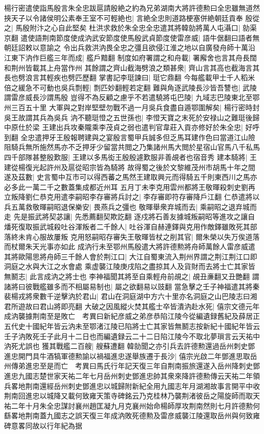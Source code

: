楊行密遣使詣馬殷言朱全忠跋扈請殷絶之約為兄弟湖南大將許德勲曰全忠雖無道然挾天子以令諸侯明公素奉王室不可輕絶也|{
	言絶全忠則道路梗塞併絶朝廷貢奉}
殷從之|{
	馬殷附汴之心自此堅矣}
杜洪求救於朱全忠全忠遣其將韓勍將萬人屯灄口|{
	勍渠京翻}
遣使語荆南節度使成汭武安節度使馬殷武貞節度使雷彦威|{
	語牛倨翻曰語者無朝廷詔敕以意諭之}
令出兵救洪汭畏全忠之彊且欲侵江淮之地以自廣發舟師十萬沿江東下汭作巨艦三年而成|{
	艦戶黯翻}
制度如府署謂之和舟載|{
	署廨舍也言其舟長闊和荆州皆載其上舟當作州}
其餘謂之齊山截海劈浪之類甚衆|{
	齊山言其高也截海言其長也劈浪言其輕疾也劈匹歷翻}
掌書記李珽諫曰|{
	珽它鼎翻}
今每艦載甲士千人稻米倍之緩急不可動也吳兵剽輕|{
	剽匹妙翻輕若定翻}
難與角逐武陵長沙皆吾讐也|{
	武陵謂雷彦威長沙謂馬殷}
豈得不為反顧之慮乎不若遣驍將屯巴陵|{
	九域志巴陵東北至鄂州三百五十里}
大軍與之對岸堅壁勿戰不過一月吳兵食盡自遁鄂圍解矣|{
	楊行密時封吳王故謂其兵為吳兵}
汭不聽珽憕之五世孫也|{
	李憕天寶之末死於安禄山之難珽後歸中原仕於梁}
王建出兵攻秦隴乘李茂貞之弱也遣判官韋莊入貢亦修好於朱全忠|{
	好呼到翻}
全忠遣押牙王殷報聘建與之宴殷言蜀甲兵誠多但乏馬耳建作色曰當道江山險阻騎兵無所施然馬亦不乏押牙少留當共閲之乃集諸州馬大閲於星宿山官馬八千私馬四千部隊甚整殷歎服|{
	王建以多馬衒王殷殷遽歎服非善覘者也宿音秀}
建本騎將|{
	王建從楊復光起許州及扈從昭宗皆為騎將}
故得蜀之後於文黎維茂州市胡馬十年之間遂及茲數|{
	史言蜀中互市可以得西蕃之馬然王建取興元而得騎五千則東西川之馬亦必多此一萬二千之數蓋集成都近州耳}
五月丁未李克用雲州都將王敬暉殺刺史劉再立叛降劉仁恭克用遣李嗣昭李存審將兵討之|{
	李存審即符存審降戶江翻}
仁恭遣將以兵五萬救敬暉嗣昭退保樂安|{
	畏燕兵之彊也}
敬暉舉衆弃城而去|{
	乘嗣昭之退弃城而走}
先是振武將契苾讓|{
	先悉薦翻契欺訖翻}
逐戍將石善友據城叛嗣昭等進攻之讓自燔死復取振武城殺吐谷渾叛者二千餘人|{
	吐谷渾自赫連鐸與克用作敵鐸雖敗死其部落終未肯心服故屢叛}
克用怒嗣昭存審失王敬暉皆杖之削其官|{
	爾朱榮以失万俟道落而杖爾朱天光事亦如此}
成汭行未至鄂州馬殷遣大將許德勲將舟師萬餘人雷彦威遣其將歐陽思將舟師三千餘人會於荆江口|{
	大江自蜀東流入荆州界謂之荆江荆江口即洞庭之水與大江之水會處}
乘虚襲江陵庚戌陷之盡掠其人及貨財而去將士亡其家皆無鬭志|{
	此言成汭之將士也}
李神福聞其將至自乘輕舟前覘之|{
	覘丑亷翻又丑艷翻}
謂諸將曰彼戰艦雖多而不相屬易制也|{
	屬之欲翻易以豉翻}
當急擊之壬子神福遣其將秦裴楊戎將衆數千逆擊汭於君山|{
	君山在洞庭湖中方六十里亦名洞庭之山巴陵志曰湘君所遊故曰君山將即亮翻}
大破之因風縱火焚其艦士卒皆潰汭赴水死|{
	僖宗文德元年成汭襲據荆南至是敗亡　考異曰新紀彦威之弟彦恭陷江陵今從編遺録舊紀及薛居正五代史十國紀年皆云汭未至鄂渚江陵已陷將士亡其家皆無鬭志按新紀十國紀年皆云壬子汭敗死壬子此月十二日也而編遺録云二十二日陷江陵今不取北夢瑣言云天祐中汭死尤誤也}
獲其戰艦二百艘|{
	艘蘇遭翻}
韓勍聞之亦引兵去許德勲還過岳州刺史鄧進忠開門具牛酒犒軍德勲諭以禍福進忠遂舉族遷于長沙|{
	僖宗光啟二年鄧進思取岳州傳弟進忠至是而亡　考異曰馬氏行年記天復三年自荆南振旅還遂入岳州降刺史鄧進忠九國志楚世家天祐二年七月岳州刺史鄧進忠帥其衆來降許德勲傳云天祐二年領兵畧地荆南還經岳州刺史鄧進忠以城歸附新紀全用九國志年月湖湘故事言開平中收荆南回進忠以城降又載何致雍天策寺碑銘云乃克桂林乃襲荆渚彼岳之陽旋師而取天祐二年十月朱全忠謀討襄州趙匡凝九月克襄州始命楊師厚攻荆南然則七月許德勲何繇畧地荆南蓋九國志之誤天復三年成汭敗死德勲及雷彦威襲江陵還取岳州與何致雍碑意畧同故以行年紀為据}
